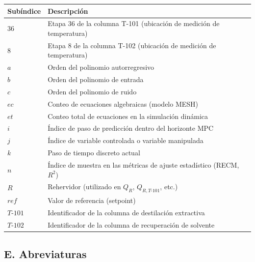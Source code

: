 \begin{tabularx}{\textwidth}{@{} l X @{}}
\toprule
\textbf{Subíndice} & \textbf{Descripción} \\
\midrule
$36$                & Etapa 36 de la columna T-101 (ubicación de medición de temperatura) \\
$8$                 & Etapa 8 de la columna T-102 (ubicación de medición de temperatura) \\
$a$                 & Orden del polinomio autorregresivo \\
$b$                 & Orden del polinomio de entrada \\
$c$                 & Orden del polinomio de ruido \\
$ec$                & Conteo de ecuaciones algebraicas (modelo MESH) \\
$et$                & Conteo total de ecuaciones en la simulación dinámica \\
$i$                 & Índice de paso de predicción dentro del horizonte MPC \\
$j$                 & Índice de variable controlada o variable manipulada \\
$k$                 & Paso de tiempo discreto actual \\
$n$                 & Índice de muestra en las métricas de ajuste estadístico (RECM, $R^2$) \\
$R$                 & Rehervidor (utilizado en $Q_{R}$, $Q_{R,T\text{-}101}$, etc.) \\
$ref$               & Valor de referencia (setpoint) \\
$T\text{-}101$      & Identificador de la columna de destilación extractiva \\
$T\text{-}102$      & Identificador de la columna de recuperación de solvente \\
\bottomrule
\end{tabularx}

\bigskip

\subsection*{E. Abreviaturas}

